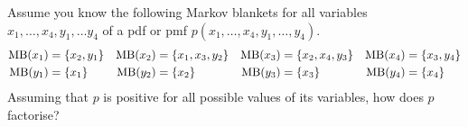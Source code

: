 
\label{ex:factorisation-from-the-Markov-blankets-I}

Assume you know the following Markov blankets for all variables $x_1,
\ldots, x_4, y_1, \ldots y_4$ of a pdf or pmf $p(x_1, \ldots, x_4,
y_1, \ldots,y_4)$. 
\begin{align}
  \textrm{MB}(x_1) &= \{x_2, y_1\} & \textrm{MB}(x_2)&=\{x_1, x_3, y_2\} & \textrm{MB}(x_3)&=\{x_2, x_4, y_3\} & \textrm{MB}(x_4)&=\{x_3, y_4\}\\
  \textrm{MB}(y_1) &= \{x_1\}      & \textrm{MB}(y_2)&= \{x_2\}         &  \textrm{MB}(y_3)&= \{x_3\}         &  \textrm{MB}(y_4) &= \{x_4\}
\end{align}
Assuming that $p$ is positive for all possible
values of its variables, how does $p$ factorise?

